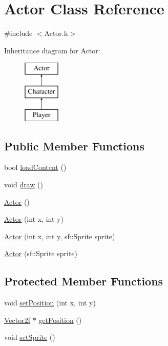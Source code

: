 \hypertarget{class_actor}{\section{Actor Class Reference}
\label{class_actor}
}


{\ttfamily \#include $<$Actor.\-h$>$}

Inheritance diagram for Actor\-:\begin{figure}[H]
\begin{center}
\leavevmode
\includegraphics[height=3.000000cm]{class_actor}
\end{center}
\end{figure}
\subsection*{Public Member Functions}
\begin{DoxyCompactItemize}
\item 
bool \hyperlink{class_actor_a60c7df9b26c488c69cc6c3ade1d5e405}{load\-Content} ()
\item 
void \hyperlink{class_actor_ac8bc898122ba0aaa8383187525edeaf6}{draw} ()
\item 
\hyperlink{class_actor_a2a0ff4335a1ee9096df90f288c026c8b}{Actor} ()
\item 
\hyperlink{class_actor_ab8cede14b717ebbdb29f8164178c876a}{Actor} (int x, int y)
\item 
\hyperlink{class_actor_a6be1c55f99c17cd3ed53c98c26222b0e}{Actor} (int x, int y, sf\-::\-Sprite sprite)
\item 
\hyperlink{class_actor_a55bb8f581a59fe3d2be4a90c29ce1e7a}{Actor} (sf\-::\-Sprite sprite)
\end{DoxyCompactItemize}
\subsection*{Protected Member Functions}
\begin{DoxyCompactItemize}
\item 
void \hyperlink{class_actor_a04ab5a0b1f9d0528a45696befcb97e1f}{set\-Position} (int x, int y)
\item 
\hyperlink{class_vector2f}{Vector2f} $\ast$ \hyperlink{class_actor_a9ec6f26161cadc978f8ba6d2c5ba1377}{get\-Position} ()
\item 
void \hyperlink{class_actor_a59bd7eda50ba530619a95c1758b8069b}{set\-Sprite} ()
\end{DoxyCompactItemize}
